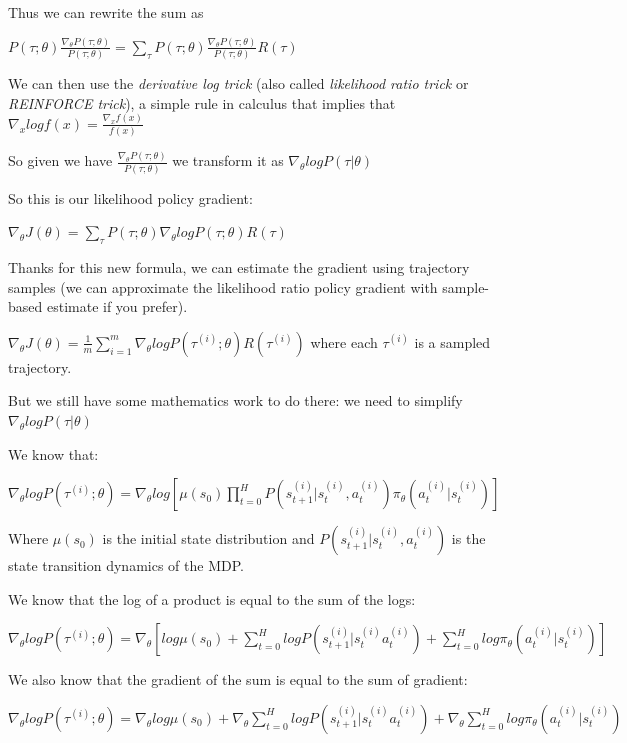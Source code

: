 \documentclass[11pt,a4paper]{article}
\begin{document}
Thus we can rewrite the sum as

\(P(\tau;\theta)\frac{\nabla_\theta P(\tau;\theta)}{P(\tau;\theta)}= \sum_{\tau} P(\tau;\theta) \frac{\nabla_\theta P(\tau;\theta)}{P(\tau;\theta)}R(\tau)\)

We can then use the \emph{derivative log trick} (also called \emph{likelihood ratio trick} or \emph{REINFORCE trick}), a simple rule in calculus that implies that \(\nabla_x log f(x) = \frac{\nabla_x f(x)}{f(x)}\)

So given we have \(\frac{\nabla_\theta P(\tau;\theta)}{P(\tau;\theta)}\) we transform it as \(\nabla_\theta log P(\tau|\theta)\)

So this is our likelihood policy gradient:

\(\nabla_\theta J(\theta) = \sum_{\tau} P(\tau;\theta)  \nabla_\theta log P(\tau;\theta) R(\tau)\)

Thanks for this new formula, we can estimate the gradient using trajectory samples (we can approximate the likelihood ratio policy gradient with sample-based estimate if you prefer).

\(\nabla_\theta J(\theta) = \frac{1}{m} \sum^{m}_{i=1} \nabla_\theta log P(\tau^{(i)};\theta)R(\tau^{(i)})\) where each \(\tau^{(i)}\) is a sampled trajectory.

But we still have some mathematics work to do there: we need to simplify \(\nabla_\theta log P(\tau|\theta)\)

We know that:

\(\nabla_\theta log P(\tau^{(i)};\theta)= \nabla_\theta log[ \mu(s_0) \prod_{t=0}^{H} P(s_{t+1}^{(i)}|s_{t}^{(i)}, a_{t}^{(i)}) \pi_\theta(a_{t}^{(i)}|s_{t}^{(i)})]\)

Where \(\mu(s_0)\) is the initial state distribution and \(P(s_{t+1}^{(i)}|s_{t}^{(i)}, a_{t}^{(i)})\) is the state transition dynamics of the MDP.

We know that the log of a product is equal to the sum of the logs:

\(\nabla_\theta log P(\tau^{(i)};\theta)= \nabla_\theta \left[log \mu(s_0) + \sum\limits_{t=0}^{H}log P(s_{t+1}^{(i)}|s_{t}^{(i)} a_{t}^{(i)}) + \sum\limits_{t=0}^{H}log \pi_\theta(a_{t}^{(i)}|s_{t}^{(i)})\right]\)

We also know that the gradient of the sum is equal to the sum of gradient:

\(\nabla_\theta log P(\tau^{(i)};\theta)=\nabla_\theta log\mu(s_0) + \nabla_\theta \sum\limits_{t=0}^{H} log P(s_{t+1}^{(i)}|s_{t}^{(i)} a_{t}^{(i)}) + \nabla_\theta \sum\limits_{t=0}^{H} log \pi_\theta(a_{t}^{(i)}|s_{t}^{(i)})\)
\end{document}
